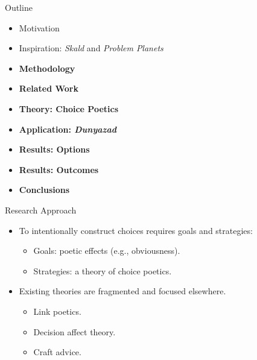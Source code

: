 \documentclass[xcolor=x11names]{beamer}
\def\dunyazad/{\textit{Dunyazad}}
\def\skald/{\textit{Skald}}
\def\problemplanets/{\textit{Problem Planets}}
\begin{document}
\begin{frame}{Outline}
  \begin{itemize}
    \item Motivation
    \item Inspiration: \skald/ and \problemplanets/
    \item \textbf{Methodology}
    \item \textbf{Related Work}
    \item \textbf{Theory: Choice Poetics}
    \item \textbf{Application: \dunyazad/}
    \item \textbf{Results: Options}
    \item \textbf{Results: Outcomes}
    \item \textbf{Conclusions}
  \end{itemize}
\end{frame}

\begin{frame}{Research Approach}
  \begin{itemize}\addtolength{\itemsep}{0.5\baselineskip}
    \item To intentionally construct choices requires goals and strategies:%
    \begin{itemize}\addtolength{\itemsep}{0.5\baselineskip}
      \vspace{0.5\baselineskip}
      \item Goals: poetic effects (e.g., obviousness).
      \item Strategies: a theory of choice poetics.
    \end{itemize}
    \item Existing theories are fragmented and focused elsewhere.
    \begin{itemize}\addtolength{\itemsep}{0.5\baselineskip}
      \vspace{0.5\baselineskip}
      \item Link poetics.
      \item Decision affect theory.
      \item Craft advice.
    \end{itemize}
  \end{itemize}
\end{frame}
\end{document}
